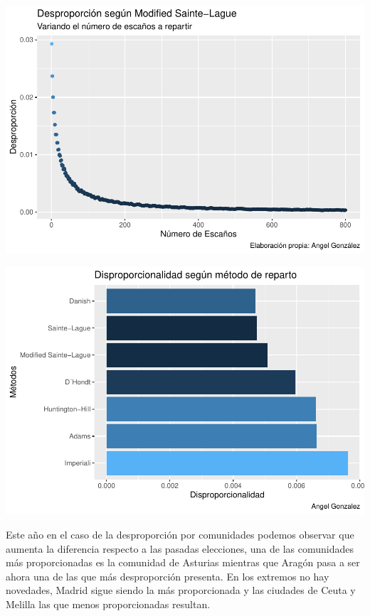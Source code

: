 \documentclass[12pt,a4paper,]{book}
\numberwithin{dummy}{section}
\theoremstyle{ocrenumbox}
\theoremstyle{blacknumex}
\theoremstyle{blacknumbox}
\theoremstyle{ocrenum}
\theoremstyle{ocrenum}
\begin{document}
\begin{center}\includegraphics[width=1\linewidth]{figurasR/unnamed-chunk-15-1} \end{center}

\begin{center}\includegraphics[width=1\linewidth]{figurasR/unnamed-chunk-15-2} \end{center}

Este año en el caso de la desproporción por comunidades podemos observar
que aumenta la diferencia respecto a las pasadas elecciones, una de las
comunidades más proporcionadas es la comunidad de Asturias mientras que
Aragón pasa a ser ahora una de las que más desproporción presenta. En
los extremos no hay novedades, Madrid sigue siendo la más proporcionada
y las ciudades de Ceuta y Melilla las que menos proporcionadas resultan.
\end{document}
